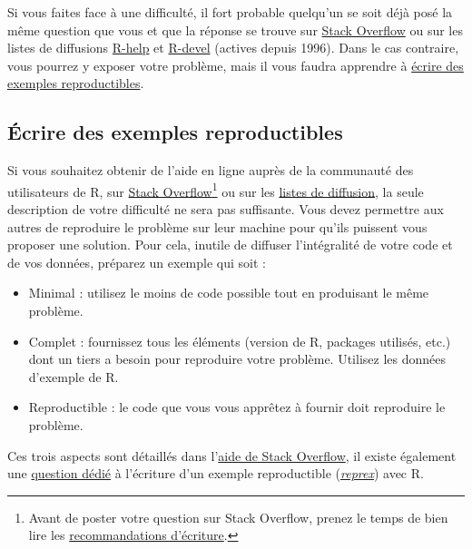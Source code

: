\documentclass[
  french,
]{scrbook}
\providecommand{\tightlist}{%
  \setlength{\itemsep}{0pt}\setlength{\parskip}{0pt}}
\begin{document}
\begin{tcolorbox}[fonttitle=\sffamily\bfseries\large,title=Conseil,colframe=darkcyan]

Si vous faites face à une difficulté, il fort probable quelqu'un se soit déjà posé la même question que vous et que la réponse se trouve sur \href{https://stackoverflow.com/questions/tagged/r}{Stack Overflow} ou sur les listes de diffusions \href{https://stat.ethz.ch/mailman/listinfo/r-help}{R-help} et \href{https://stat.ethz.ch/mailman/listinfo/r-devel}{R-devel} (actives depuis 1996). Dans le cas contraire, vous pourrez y exposer votre problème, mais il vous faudra apprendre à \protect\hyperlink{rstats-reprex}{écrire des exemples reproductibles}.

\end{tcolorbox}

\hypertarget{rstats-reprex}{%
\subsection{Écrire des exemples reproductibles}\label{rstats-reprex}}

Si vous souhaitez obtenir de l'aide en ligne auprès de la communauté des utilisateurs de R, sur \href{https://stackoverflow.com/questions}{Stack Overflow}\footnote{Avant de poster votre question sur Stack Overflow, prenez le temps de bien lire les \href{https://stackoverflow.com/help/how-to-ask}{recommandations d'écriture}.} ou sur les \href{https://www.r-project.org/mail.html}{listes de diffusion}, la seule description de votre difficulté ne sera pas suffisante. Vous devez permettre aux autres de reproduire le problème sur leur machine pour qu'ils puissent vous proposer une solution. Pour cela, inutile de diffuser l'intégralité de votre code et de vos données, préparez un exemple qui soit :

\begin{itemize}
\tightlist
\item
  Minimal : utilisez le moins de code possible tout en produisant le même problème.
\item
  Complet : fournissez tous les éléments (version de R, packages utilisés, etc.) dont un tiers a besoin pour reproduire votre problème. Utilisez les données d'exemple de R.
\item
  Reproductible : le code que vous vous apprêtez à fournir doit reproduire le problème.
\end{itemize}

Ces trois aspects sont détaillés dans l'\href{https://stackoverflow.com/help/minimal-reproducible-example}{aide de Stack Overflow}, il existe également une \href{https://stackoverflow.com/questions/5963269/how-to-make-a-great-r-reproducible-example}{question dédié} à l'écriture d'un exemple reproductible (\href{https://twitter.com/romain_francois/status/530011023743655936}{\emph{reprex}}) avec R.
\end{document}
